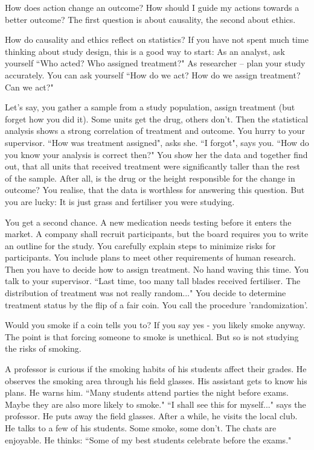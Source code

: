 How does action change an outcome?
How should I guide my actions towards a better outcome?
The first question is about causality, the second about ethics.

How do causality and ethics reflect on statistics?
If you have not spent much time thinking about study design, this is a good way to start: 
As an analyst, ask yourself “Who acted? Who assigned treatment?"
As researcher -- plan your study accurately. You can ask yourself “How do we act? How do we assign treatment? Can we act?"

Let's say, you gather a sample from a study population, assign treatment (but forget how you did it). Some units get the drug, others don't. Then the statistical analysis shows a strong correlation of treatment and outcome. You hurry to your supervisor. “How was treatment assigned", asks she. “I forgot", says you.
“How do you know your analysis is correct then?"
You show her the data and together find out, that all units that received treatment were significantly taller than the rest of the sample.
After all, is the drug or the height responsible for the change  in outcome?
You realise, that the data is worthless for answering this question.
But you are lucky: It is just grass and fertiliser you were studying.

You get a second chance. A new medication needs testing before it enters the market. 
A company shall recruit participants, but the board requires you to write an outline for the study.
You carefully  explain steps to minimize risks for participants. You include plans to meet other requirements of human research.
Then you have to decide how to assign treatment.
No hand waving this time. You talk to your supervisor.
“Last time, too many tall blades received fertiliser. The distribution of treatment was not really random..."
You decide to determine treatment status by the flip of a fair coin.
You call the procedure 'randomization'.

Would you smoke if a coin tells you to? If you say yes - you likely smoke anyway. The point is that forcing someone to smoke is unethical. But so is not studying the risks of smoking.

A professor is curious if the smoking habits of his students affect their grades. 
He observes the smoking area through his field glasses.
His assistant gets to know his plans. He warns him. “Many students attend parties the night before exams. Maybe they are also more likely to smoke." “I shall see this for myself..." says the professor. He puts away the field glasses. After a while, he visits the local club.
He talks to a few of his students. Some smoke, some don't. The chats are enjoyable. He thinks: “Some of my best students celebrate before the exams."


